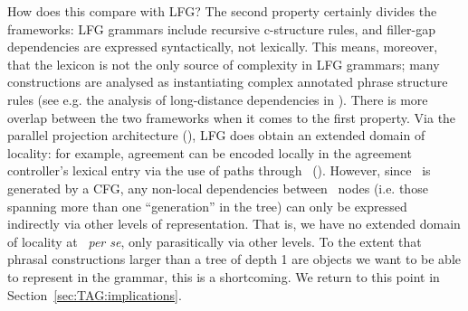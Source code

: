 \documentclass[output=paper,hidelinks]{langscibook}
\begin{document}
How does this compare with LFG? The second property certainly divides the
frameworks: LFG grammars include recursive c-structure rules, and filler-gap
dependencies are expressed syntactically, not lexically. This means, moreover,
that the lexicon is not the only source of complexity in LFG grammars; many
constructions are analysed as instantiating complex annotated phrase structure
rules (see e.g. the analysis of long-distance dependencies in
\citealt[ch.~17]{DLM:LFG}). There is more overlap between the two frameworks
when it comes to the first property. Via the parallel projection architecture
(), LFG does obtain an extended domain of
locality: for example, agreement can be encoded locally in the agreement
controller's lexical entry via the use of paths through \fstruc\
().
However, since \cstruc\ is generated by a CFG, any non-local dependencies
between \cstruc\ nodes (i.e. those spanning more than one ``generation'' in the
tree) can only be expressed indirectly via other levels of representation. That
is, we have no extended domain of locality at \cstruc\ \textit{per se}, only
parasitically via other levels.
To the extent that phrasal constructions larger than a tree of depth 1 are
objects we want to be able to represent in the grammar, this is a shortcoming.
We return to this point in Section~\ref{sec:TAG:implications}.
\end{document}
